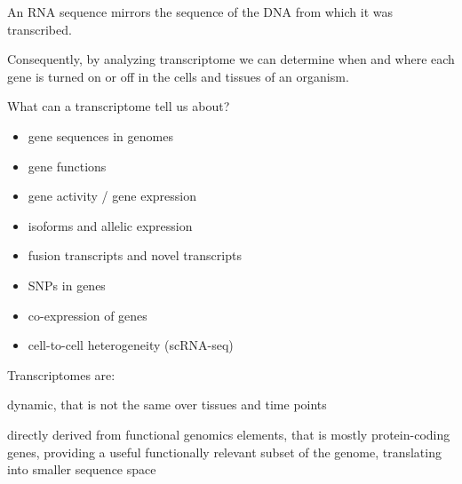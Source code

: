 \documentclass{beamer}\usepackage[]{graphicx}\usepackage[]{color}
\begin{document}
\begin{frame}
\begin{displayquote}
An RNA sequence mirrors the sequence of the DNA from which it was transcribed.
\end{displayquote}
\begin{displayquote}
Consequently, by analyzing transcriptome we can determine when and where each gene is turned on or off in the cells and tissues of an organism.
\end{displayquote}
\end{frame}

\begin{frame}
\begin{block}{What can a transcriptome tell us about?}
\begin{itemize}
\item gene sequences in genomes
\item gene functions
\item gene activity / gene expression
\item isoforms and allelic expression
\item fusion transcripts and novel transcripts
\item SNPs in genes
\item co-expression of genes 
\item cell-to-cell heterogeneity (scRNA-seq)
\end{itemize}
\end{block}
\end{frame}

\begin{frame}
Transcriptomes are: \newline \newline
\begin{displayquote}
dynamic, that is not the same over tissues and time points
\end{displayquote}
\begin{displayquote}
directly derived from functional genomics elements, that is mostly protein-coding genes, providing a useful functionally relevant subset of the genome, translating into smaller sequence space
\end{displayquote}
\end{frame}
\end{document}

